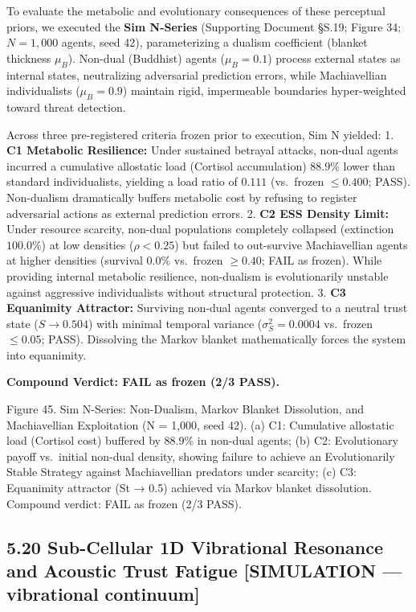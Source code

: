 \documentclass[
]{article}
\begin{document}
To evaluate the metabolic and evolutionary consequences of these
perceptual priors, we executed the \textbf{Sim N-Series} (Supporting
Document §S.19; Figure 34; \(N = 1,000\) agents, seed 42),
parameterizing a dualism coefficient (blanket thickness \(\mu_B\)).
Non-dual (Buddhist) agents (\(\mu_B = 0.1\)) process external states as
internal states, neutralizing adversarial prediction errors, while
Machiavellian individualists (\(\mu_B = 0.9\)) maintain rigid,
impermeable boundaries hyper-weighted toward threat detection.

Across three pre-registered criteria frozen prior to execution, Sim N
yielded: 1. \textbf{C1 Metabolic Resilience:} Under sustained betrayal
attacks, non-dual agents incurred a cumulative allostatic load (Cortisol
accumulation) \(88.9\%\) lower than standard individualists, yielding a
load ratio of \(0.111\) (vs.~frozen \(\le 0.400\); PASS). Non-dualism
dramatically buffers metabolic cost by refusing to register adversarial
actions as external prediction errors. 2. \textbf{C2 ESS Density Limit:}
Under resource scarcity, non-dual populations completely collapsed
(extinction \(100.0\%\)) at low densities (\(\rho < 0.25\)) but failed
to out-survive Machiavellian agents at higher densities (survival
\(0.0\%\) vs.~frozen \(\ge 0.40\); FAIL as frozen). While providing
internal metabolic resilience, non-dualism is evolutionarily unstable
against aggressive individualists without structural protection. 3.
\textbf{C3 Equanimity Attractor:} Surviving non-dual agents converged to
a neutral trust state (\(S \to 0.504\)) with minimal temporal variance
(\(\sigma_S^2 = 0.0004\) vs.~frozen \(\le 0.05\); PASS). Dissolving the
Markov blanket mathematically forces the system into equanimity.

\textbf{Compound Verdict: FAIL as frozen (2/3 PASS).}

Figure 45. Sim N-Series: Non-Dualism, Markov Blanket Dissolution, and
Machiavellian Exploitation ({N = 1,000}, seed 42). (a) C1: Cumulative
allostatic load (Cortisol cost) buffered by 88.9\% in non-dual agents;
(b) C2: Evolutionary payoff vs.~initial non-dual density, showing
failure to achieve an Evolutionarily Stable Strategy against
Machiavellian predators under scarcity; (c) C3: Equanimity attractor
({St → 0.5}) achieved via Markov blanket dissolution. Compound verdict:
FAIL as frozen (2/3 PASS).

\subsection{5.20 Sub-Cellular 1D Vibrational Resonance and Acoustic
Trust Fatigue {[}SIMULATION --- vibrational
continuum{]}}\label{sub-cellular-1d-vibrational-resonance-and-acoustic-trust-fatigue-simulation-vibrational-continuum}
\end{document}
